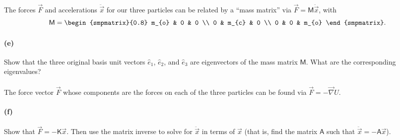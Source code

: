 \documentclass{article}
\begin{document}
\phline
\paragraph{}
The forces $\vec{F}$ and accelerations $\ddot{\vec{x}}$ for our three particles  can be related by a ``mass matrix'' via $\vec{F} = \mathsf{M}\ddot{\vec{x}}$, with
	\begin{equation*}
		\mathsf{M} = \begin{smpmatrix}{0.8} m_{o} & 0 & 0 \\ 0 & m_{c} & 0 \\ 0 & 0 & m_{o} \end{smpmatrix}.
	\end{equation*}

\paragraph{(e)}		\extrapart
Show that the three original basis unit vectors $\hat{e}_{1}$, $\hat{e}_{2}$, and $\hat{e}_{3}$ are eigenvectors of the mass matrix $\mathsf{M}$.  What are the corresponding
eigenvalues?

\phline
\paragraph{}
The force vector $\vec{F}$ whose components are the forces on each of the three particles can be found via $\vec{F} = -\vec{\nabla}U$.

\paragraph{(f)}
Show that $\vec{F} = -\mathsf{K}\vec{x}$.  Then use the matrix inverse to solve for $\ddot{\vec{x}}$ in terms of $\vec{x}$ (that is, find the matrix $\mathsf{A}$ such that $\ddot{\vec{x}}
= -\mathsf{A}\vec{x}$).\\
\end{document}
